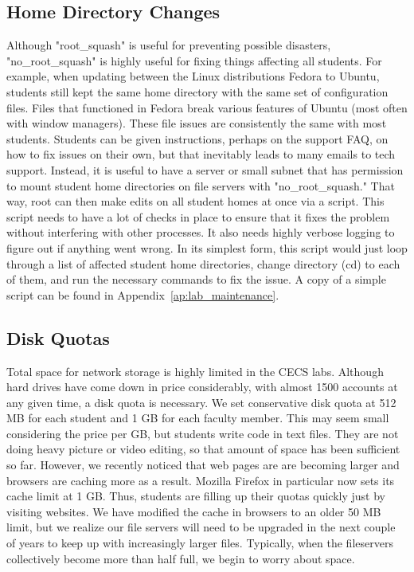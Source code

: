 \subsection{Home Directory Changes}
Although "root\_squash" is useful for preventing possible disasters, "no\_root\_squash" is highly useful for fixing things affecting all students.  For example, when updating between the Linux distributions Fedora to Ubuntu, students still kept the same home directory with the same set of configuration files.  Files that functioned in Fedora break various features of Ubuntu (most often with window managers).  These file issues are consistently the same with most students. Students can be given instructions, perhaps on the support FAQ, on how to fix issues on their own, but that inevitably leads to many emails to tech support.  Instead, it is useful to have a server or small subnet that has permission to mount student home directories on file servers with "no\_root\_squash."  That way, root can then make edits on all student homes at once via a script.  This script needs to have a lot of checks in place to ensure that it fixes the problem without interfering with other processes.  It also needs highly verbose logging to figure out if anything went wrong.  In its simplest form, this script would just loop through a list of affected student home directories, change directory (cd) to each of them, and run the necessary commands to fix the issue.  A copy of a simple script can be found in Appendix~\ref{ap:lab_maintenance}.

\subsection{Disk Quotas}
Total space for network storage is highly limited in the CECS labs.  Although hard drives have come down in price considerably, with almost 1500 accounts at any given time, a disk quota is necessary.  We set conservative disk quota at 512 MB for each student and 1 GB for each faculty member.  This may seem small considering the price per GB, but students write code in text files.  They are not doing heavy picture or video editing, so that amount of space has been sufficient so far.  However, we recently noticed that web pages are are becoming larger and browsers are caching more as a result.  Mozilla Firefox in particular now sets its cache limit at 1 GB.  Thus, students are filling up their quotas quickly just by visiting websites.  We have modified the cache in browsers to an older 50 MB limit, but we realize our file servers will need to be upgraded in the next couple of years to keep up with increasingly larger files.  Typically, when the fileservers collectively become more than half full, we begin to worry about space.  

